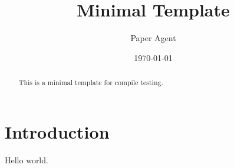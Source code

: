 \documentclass{article}
\title{Minimal Template}
\author{Paper Agent}
\date{\today}
\begin{document}
\maketitle
\begin{abstract}
This is a minimal template for compile testing.
\end{abstract}
\section{Introduction}
Hello world.
\end{document}
